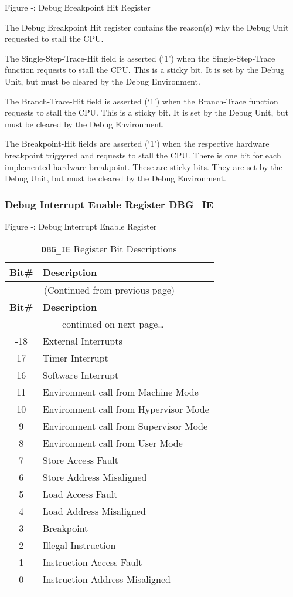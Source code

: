 \missingfigure{}

Figure ‑: Debug Breakpoint Hit Register

The Debug Breakpoint Hit register contains the reason(s) why the Debug
Unit requested to stall the CPU.

The Single-Step-Trace-Hit field is asserted (`1') when the
Single-Step-Trace function requests to stall the CPU. This is a sticky
bit. It is set by the Debug Unit, but must be cleared by the Debug
Environment.

The Branch-Trace-Hit field is asserted (`1') when the Branch-Trace
function requests to stall the CPU. This is a sticky bit. It is set by
the Debug Unit, but must be cleared by the Debug Environment.

The Breakpoint-Hit fields are asserted (`1') when the respective
hardware breakpoint triggered and requests to stall the CPU. There is
one bit for each implemented hardware breakpoint. These are sticky bits.
They are set by the Debug Unit, but must be cleared by the Debug
Environment.

\subsubsection{Debug Interrupt Enable Register
DBG\_IE}\label{debug-interrupt-enable-register-dbg_ie}

\missingfigure{}

Figure ‑: Debug Interrupt Enable Register


\begin{longtable}[]{@{}cl@{}}
\toprule
\textbf{Bit\#} & \textbf{Description}\tabularnewline
\midrule
\endfirsthead
\multicolumn{2}{c}{{(Continued from previous page)}} \\
\toprule
\textbf{Bit\#} & \textbf{Description}\tabularnewline
\midrule
\endhead
\midrule \multicolumn{2}{c}{{\tablename\ \thetable{} continued on next page\ldots}} \\
\endfoot
\endlastfoot
31-18 & External Interrupts\tabularnewline
17 & Timer Interrupt\tabularnewline
16 & Software Interrupt\tabularnewline
11 & Environment call from Machine Mode\tabularnewline
10 & Environment call from Hypervisor Mode\tabularnewline
9 & Environment call from Supervisor Mode\tabularnewline
8 & Environment call from User Mode\tabularnewline
7 & Store Access Fault\tabularnewline
6 & Store Address Misaligned\tabularnewline
5 & Load Access Fault\tabularnewline
4 & Load Address Misaligned\tabularnewline
3 & Breakpoint\tabularnewline
2 & Illegal Instruction\tabularnewline
1 & Instruction Access Fault\tabularnewline
0 & Instruction Address Misaligned\tabularnewline
\bottomrule
\caption{\texttt{DBG\_IE} Register Bit Descriptions}
\label{tab:dbg-ie-reg-bits}
\end{longtable}

